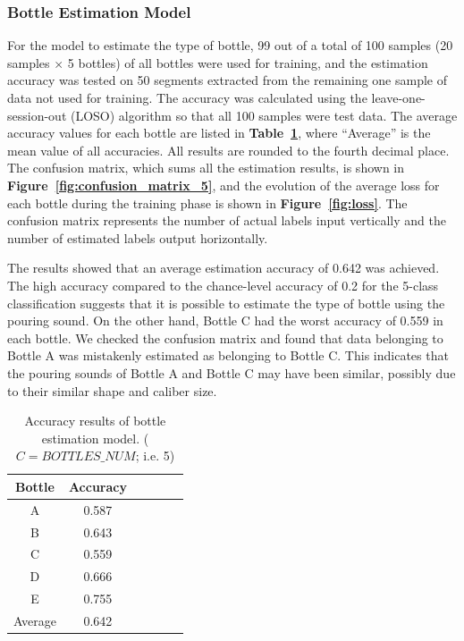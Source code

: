 \documentclass[sigconf]{acmart}
\newcommand\figref[1]{\textbf{Figure~\ref{fig:#1}}}
\newcommand\tabref[1]{\textbf{Table~\ref{tab:#1}}}
\begin{document}
\subsubsection{Bottle Estimation Model}
For the model to estimate the type of bottle, 99 out of a total of 100 samples (20 samples $\times$ 5 bottles) of all bottles were used for training, and the estimation accuracy was tested on 50 segments extracted from the remaining one sample of data not used for training. The accuracy was calculated using the leave-one-session-out (LOSO) algorithm so that all 100 samples were test data. The average accuracy values for each bottle are listed in \tabref{result_5}, where ``Average'' is the mean value of all accuracies. All results are rounded to the fourth decimal place. The confusion matrix, which sums all the estimation results, is shown in \figref{confusion_matrix_5}, and the evolution of the average loss for each bottle during the training phase is shown in \figref{loss}. The confusion matrix represents the number of actual labels input vertically and the number of estimated labels output horizontally.\par

The results showed that an average estimation accuracy of 0.642 was achieved. The high accuracy compared to the chance-level accuracy of 0.2 for the 5-class classification suggests that it is possible to estimate the type of bottle using the pouring sound. On the other hand, Bottle C had the worst accuracy of 0.559 in each bottle. We checked the confusion matrix and found that data belonging to Bottle A was mistakenly estimated as belonging to Bottle C. This indicates that the pouring sounds of Bottle A and Bottle C may have been similar, possibly due to their similar shape and caliber size.

\begin{table}[!t]
  \centering
  \caption{Accuracy results of bottle estimation model. ($C=BOTTLES\_NUM$; i.e. 5)}
  \begin{tabular}{c|ccccc} \hline\hline
    Bottle & Accuracy \\ \hline
    A & 0.587 \\
    B & 0.643 \\
    C & 0.559 \\
    D & 0.666 \\
    E & 0.755 \\ \hline
    Average & 0.642 \\ \hline
  \end{tabular}
  \label{tab:result_5}
\end{table}
\end{document}
